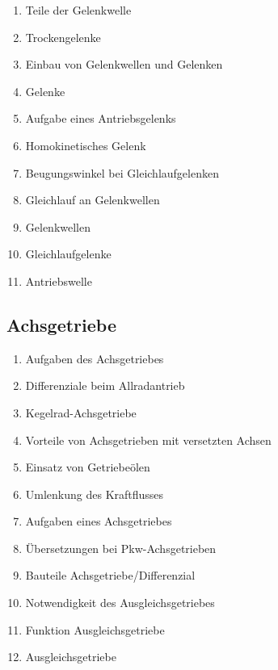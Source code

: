 \begin{enumerate}
\item
  Teile der Gelenkwelle\\
\item
  Trockengelenke\\
\item
  Einbau von Gelenkwellen und Gelenken\\
\item
  Gelenke\\
\item
  Aufgabe eines Antriebsgelenks\\
\item
  Homokinetisches Gelenk\\
\item
  Beugungswinkel bei Gleichlaufgelenken\\
\item
  Gleichlauf an Gelenkwellen\\
\item
  Gelenkwellen\\
\item
  Gleichlaufgelenke\\
\item
  Antriebswelle
\end{enumerate}

\subsection{Achsgetriebe}\label{achsgetriebe}

\begin{enumerate}
\item
  Aufgaben des Achsgetriebes\\
\item
  Differenziale beim Allradantrieb\\
\item
  Kegelrad-Achsgetriebe\\
\item
  Vorteile von Achsgetrieben mit versetzten Achsen\\
\item
  Einsatz von Getriebeölen\\
\item
  Umlenkung des Kraftflusses\\
\item
  Aufgaben eines Achsgetriebes\\
\item
  Übersetzungen bei Pkw-Achsgetrieben\\
\item
  Bauteile Achsgetriebe/Differenzial\\
\item
  Notwendigkeit des Ausgleichsgetriebes\\
\item
  Funktion Ausgleichsgetriebe\\
\item
  Ausgleichsgetriebe
\end{enumerate}

